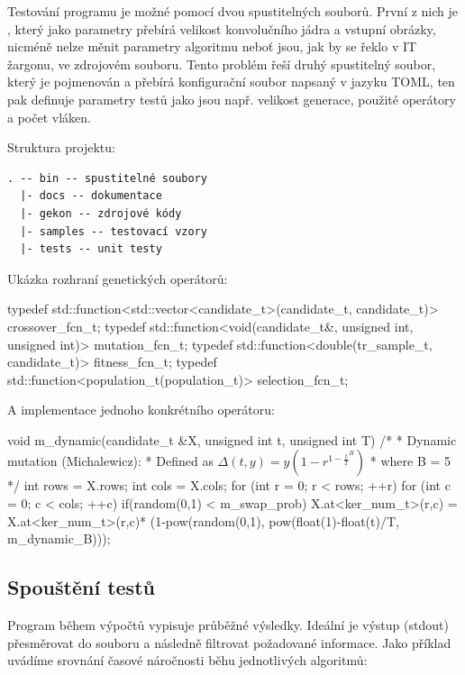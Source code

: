 \documentclass[a4paper,11pt]{scrartcl}
\begin{document}
Testování programu je možné pomocí dvou spustitelných souborů. První z nich je , který jako parametry přebírá velikost konvolučního jádra a vstupní obrázky, nicméně nelze měnit parametry algoritmu neboť jsou, jak by se řeklo v IT žargonu,  ve zdrojovém souboru. Tento problém řeší druhý spustitelný soubor, který je pojmenován  a přebírá konfigurační soubor napsaný v jazyku TOML, ten pak definuje parametry testů jako jsou např. velikost generace, použité operátory a počet vláken.


Struktura projektu:
\begin{verbatim}
. -- bin -- spustitelné soubory
  |- docs -- dokumentace
  |- gekon -- zdrojové kódy
  |- samples -- testovací vzory
  |- tests -- unit testy
\end{verbatim}

Ukázka rozhraní genetických operátorů:
\begin{cppcode}
typedef std::function<std::vector<candidate_t>(candidate_t, candidate_t)> crossover_fcn_t;
typedef std::function<void(candidate_t&, unsigned int, unsigned int)> mutation_fcn_t;
typedef std::function<double(tr_sample_t, candidate_t)> fitness_fcn_t;
typedef std::function<population_t(population_t)> selection_fcn_t;
\end{cppcode}

A implementace jednoho konkrétního operátoru:
\begin{cppcode}
void m_dynamic(candidate_t &X, unsigned int t, unsigned int T) {
    /*
     * Dynamic mutation (Michalewicz):
     * Defined as $\Delta(t,y) = y \left( 1 - r^{ {1-\frac{t}{T} }^B }  \right)$
     *     where B = 5
     */
    int rows = X.rows;
   	int cols = X.cols;
   	for (int r = 0; r < rows; ++r) {
        for (int c = 0; c < cols; ++c) {
            if(random(0,1) < m_swap_prob) {
                X.at<ker_num_t>(r,c) = X.at<ker_num_t>(r,c)*
                (1-pow(random(0,1), pow(float(1)-float(t)/T, m_dynamic_B)));
            }
        }
    }
}

\end{cppcode}

\subsection{Spouštění testů}
Program během výpočtů vypisuje průběžné výsledky. Ideální je výstup (stdout) přesměrovat do souboru a následně filtrovat požadované informace. Jako příklad uvádíme srovnání časové náročnosti běhu jednotlivých algoritmů:
\end{document}
